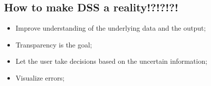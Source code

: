 \subsection{How to make DSS a reality!?!?!?!}
\begin{itemize}
\item Improve understanding of the underlying data and the output;
\item Transparency is the goal;
\item Let the user take decisions based on the uncertain information;
\item Visualize errors;
\end{itemize}

